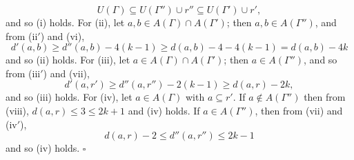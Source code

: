 \begin{equation*}
U(\Gamma) \subseteq U(\Gamma'') \cup r'' \subseteq U(\Gamma') \cup r',
\end{equation*}
and so (i) holds. For (ii), let $a, b \in A(\Gamma) \cap A(\Gamma')$; then $a, b \in A(\Gamma'')$, and from (ii$'$) and (vi),
\begin{equation*}
d'(a, b) \ge d''(a, b) - 4(k - 1) \ge d(a, b) - 4 - 4(k - 1) = d(a, b) - 4k
\end{equation*}
and so (ii) holds. For (iii), let $a \in A(\Gamma) \cap A(\Gamma')$; then $a \in A(\Gamma'')$, and so from (iii$'$) and (vii),
\begin{equation*}
d'(a, r') \ge d''(a, r'') - 2(k - 1) \ge d(a, r) - 2k,
\end{equation*}
and so (iii) holds. For (iv), let $a \in A(\Gamma)$ with $a \subseteq r'$. If $a \notin A(\Gamma'')$ then from (viii), $d(a, r) \le 3 \le 2k + 1$ and (iv) holds. If $a \in A(\Gamma'')$, then from (vii) and (iv$'$),
\begin{equation*}
d(a, r) - 2 \le d''(a, r'') \le 2k - 1
\end{equation*}
and so (iv) holds. $\square$
